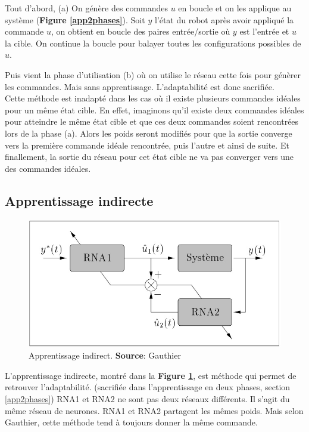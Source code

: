 Tout d'abord, (a) On génère des commandes $u$ en boucle et on les applique au système (\textbf{Figure \ref{app2phases}}).
Soit $y$ l'état du robot après avoir appliqué la commande $u$, on obtient en boucle des paires entrée/sortie où $y$ est l'entrée et $u$ la cible.
On continue la boucle pour balayer toutes les configurations possibles de $u$.

Puis vient la phase d'utilisation (b) où on utilise le réseau cette fois pour génèrer les commandes. Mais sans apprentissage. L'adaptabilité est donc sacrifiée.\\

Cette méthode est inadapté dans les cas où il existe plusieurs commandes idéales pour un même état cible.
En effet, imaginons qu'il existe deux commandes idéales pour atteindre le même état cible et que ces deux commandes soient rencontrées lors de la phase (a).
Alors les poids seront modifiés pour que la sortie converge vers la première commande idéale rencontrée, puis l'autre et ainsi de suite.
Et finallement, la sortie du réseau pour cet état cible ne va pas converger vers une des commandes idéales.

\subsection{Apprentissage indirecte}\label{sec:appindirect}
\begin{figure}
 \centering
 \includegraphics[scale=0.5]{../figures/appindirect.jpg}
 \caption{Apprentissage indirect. \textbf{Source}: Gauthier\cite{Gauthier}}
 \label{appindirect}
\end{figure}
L'apprentissage indirecte, montré dans la \textbf{Figure \ref{appindirect}}, est méthode qui permet de retrouver l'adaptabilité. (sacrifiée dans l'apprentissage en deux phases, section \ref{app2phases})
RNA1 et RNA2 ne sont pas deux réseaux différents. Il s'agit du même réseau de neurones.
RNA1 et RNA2 partagent les mêmes poids.
Mais selon Gauthier\cite{Gauthier}, cette méthode tend à toujours donner la même commande.

